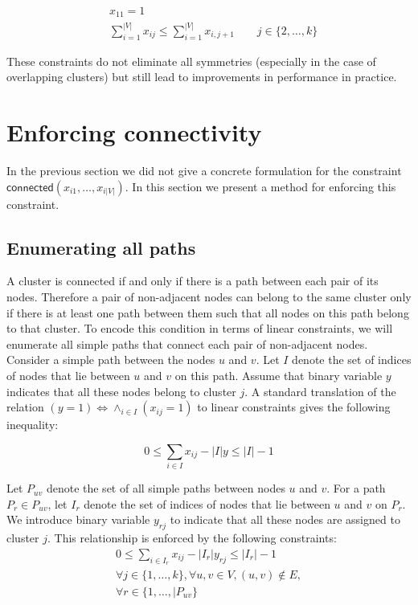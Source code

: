 \documentclass[conference,compsoc]{IEEEtran}
\begin{document}
\begin{align}
&x_{11} = 1 \\
&\sum_{i=1}^{|V|} x_{ij} \leq \sum_{i=1}^{|V|} x_{i,j+1} \qquad j \in \{2, \ldots, k\}
\end{align}

These constraints do not eliminate all symmetries (especially in the case of overlapping clusters) but still lead to improvements in performance in practice. 

\section{Enforcing connectivity}
\label{sec:connectivity}
In the previous section we did not give a concrete formulation for the constraint $\mathsf{connected}(x_{i1}, \ldots, x_{i|V|})$. In this section we present a method for enforcing this constraint.

\subsection{Enumerating all paths}
A cluster is connected if and only if there is a path between each pair of its nodes. Therefore a pair of non-adjacent nodes can belong to the same cluster only if there is at least one path between them such that all nodes on this path belong to that cluster. To encode this condition in terms of linear constraints, we will enumerate all simple paths that connect each pair of non-adjacent nodes. Consider a simple path between the nodes $u$ and $v$. Let $I$ denote the set of indices of nodes that lie between $u$ and $v$ on this path. Assume that binary variable $y$ indicates that all these nodes belong to cluster $j$. A standard translation of the relation $(y=1) \iff \land_{i \in I} (x_{ij}=1)$ to linear constraints gives the following inequality:

\begin{equation}
0 \leq \sum_{i \in I} x_{ij} - |I|y \leq |I|-1
\end{equation}

Let $P_{uv}$ denote the set of all simple paths between nodes $u$ and $v$. For a path $P_r \in P_{uv}$, let $I_r$ denote the set of indices of nodes that lie between $u$ and $v$ on $P_r$. We introduce binary variable $y_{rj}$ to indicate that all these nodes are assigned to cluster $j$. This relationship is enforced by the following constraints:
\begin{multline}
0 \leq \sum_{i\in I_r} x_{ij} - |I_r| y_{rj} \leq |I_r| - 1 \\
\forall j \in \{1, \ldots, k\}, \forall u, v \in V, (u, v) \notin E, \\ \forall r \in \{1, \ldots, |P_{uv}\}
\end{multline}
\end{document}
